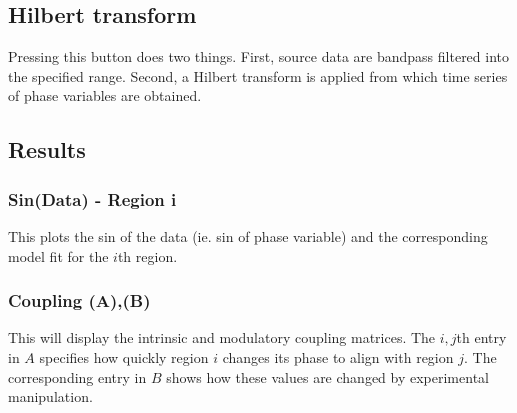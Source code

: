 \subsection{Hilbert transform}
Pressing this button does two things. First, source data are bandpass filtered into the specified range. Second, a Hilbert transform is applied from which time series of phase variables are obtained. 

\subsection{Results}

\subsubsection{Sin(Data) - Region i}
This plots the sin of the data (ie. sin of phase variable) and the corresponding model fit for the $i$th region.

\subsubsection{Coupling (A),(B)}
This will display the intrinsic and modulatory coupling matrices. The $i,j$th entry in $A$ specifies how quickly region $i$ changes its phase to align with region $j$. The corresponding entry in $B$ shows how these values are changed by experimental manipulation. 